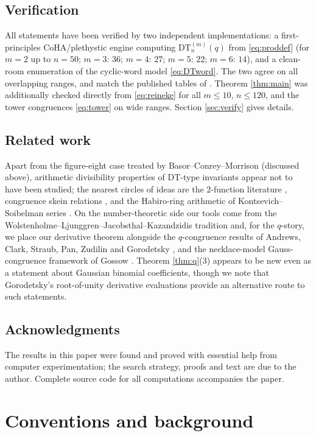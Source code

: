 \documentclass[11pt]{amsart}
\theoremstyle{definition}
\newcommand{\DT}{\mathrm{DT}}
\begin{document}
\subsection{Verification}
All statements have been verified by two independent implementations: a first-principles CoHA/plethystic engine computing $\DT^{(m)}_n(q)$ from \eqref{eq:proddef} (for $m=2$ up to $n=50$; $m=3$: $36$; $m=4$: $27$; $m=5$: $22$; $m=6$: $14$), and a clean-room enumeration of the cyclic-word model \eqref{eq:DTword}. The two agree on all overlapping ranges, and match the published tables of \cite{Rei1102,KRSS}. Theorem \ref{thm:main} was additionally checked directly from \eqref{eq:reineke} for all $m\le 10$, $n\le 120$, and the tower congruences \eqref{eq:tower} on wide ranges. Section \ref{sec:verify} gives details.

\subsection*{Related work}
Apart from the figure-eight case treated by Basor--Conrey--Morrison \cite{BCM} (discussed above), arithmetic divisibility properties of DT-type invariants appear not to have been studied; the nearest circles of ideas are the $2$-function literature \cite{KSV,SVW,Muller}, congruence skein relations \cite{CLPZ}, and the Habiro-ring arithmetic of Kontsevich--Soibelman series \cite{GSWZ}. On the number-theoretic side our tools come from the Wolstenholme--Ljunggren--Jacobsthal--Kazandzidis tradition \cite{Mestrovic,RobertZuber} and, for the $q$-story, we place our derivative theorem alongside the $q$-congruence results of Andrews, Clark, Straub, Pan, Zudilin and Gorodetsky \cite{Andrews,Clark,Straub,StraubApery,Pan,Zudilin,Gorodetsky}, and the necklace-model Gauss-congruence framework of Gossow \cite{Gossow}. Theorem \ref{thm:q}(3) appears to be new even as a statement about Gaussian binomial coefficients, though we note that Gorodetsky's root-of-unity derivative evaluations \cite[Cor.~8.2]{Gorodetsky} provide an alternative route to such statements.

\subsection*{Acknowledgments} The results in this paper were found and proved with essential help from computer experimentation; the search strategy, proofs and text are due to the author. Complete source code for all computations accompanies the paper.

\section{Conventions and background}\label{sec:conventions}
\end{document}
